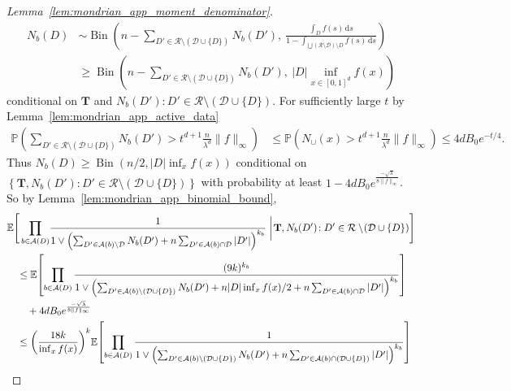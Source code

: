 \documentclass[11pt,lof]{puthesis}
\renewcommand{\P}{\ensuremath{\mathbb{P}}}
\newcommand{\E}{\ensuremath{\mathbb{E}}}
\newcommand{\bT}{\ensuremath{\mathbf{T}}}
\newcommand{\cR}{\ensuremath{\mathcal{R}}}
\newcommand{\cA}{\ensuremath{\mathcal{A}}}
\newcommand{\cD}{\ensuremath{\mathcal{D}}}
\DeclareMathOperator{\Bin}{Bin}
\newcommand{\diff}[1]{\,\mathrm{d}#1}
\theoremstyle{break}
\theoremstyle{proof}
\newtheorem{proof}{Proof}
\begin{document}
\begin{proof}[Lemma~\ref{lem:mondrian_app_moment_denominator}]
  \begin{align*}
    N_b(D)
    &\sim \Bin\left(
      n - \sum_{D' \in \cR \setminus (\cD \cup \{D\})} N_b(D'), \
      \frac{\int_{D} f(s) \diff s}
      {1 - \int_{\bigcup \left( \cR \setminus \cD \right) \setminus D}
      f(s) \diff s}
    \right) \\
    &\geq \Bin\left(
      n - \sum_{D' \in \cR \setminus (\cD \cup \{D\})} N_b(D'), \
      |D| \inf_{x \in [0,1]^d} f(x)
    \right)
  \end{align*}
  conditional on $\bT$ and
  $N_b(D') : D' \in \cR \setminus (\cD \cup \{D\})$.
  For sufficiently large $t$ by Lemma~\ref{lem:mondrian_app_active_data}
  \begin{align*}
    \P \left(
      \sum_{D' \in \cR \setminus (\cD \cup \{D\})} N_b(D')
    > t^{d+1} \frac{n}{\lambda^d} \|f\|_\infty \right)
    &\leq
    \P \left( N_{\cup}(x) > t^{d+1}
      \frac{n}{\lambda^d}
      \|f\|_\infty
    \right)
    \leq
    4 d B_0 e^{-t/4}.
  \end{align*}
  Thus
  $N_b(D) \geq \Bin(n/2, |D| \inf_x f(x))$
  conditional on
  $\left\{ \bT, N_b(D') : D' \in \cR \setminus (\cD \cup \{D\}) \right\}$
  with probability at least
  $1 - 4 d B_0 e^{\frac{-\sqrt \lambda}{8 \|f\|_\infty}}$.
  So by Lemma~\ref{lem:mondrian_app_binomial_bound},
  \begin{align*}
    &\E \Bigg[
      \prod_{b \in \cA(D)} \!
      \frac{1}{
        1 \vee \left(
          \sum_{D' \in \cA(b) \setminus \cD}
          N_b(D')
          + n \sum_{D' \in \cA(b) \cap \cD}
          |D'|
        \right)^{k_b}
      }
      \biggm|
      \!
      \bT,
      N_b(D')\! : D' \in \cR \setminus \! (\cD \cup \{D\})
    \Bigg] \\
    &\quad\leq
    \E \! \left[
      \prod_{b \in \cA(D)}
      \frac{(9k)^{k_b}}{
        1 \vee \left(
          \sum_{D' \in \cA(b) \setminus (\cD \cup \{D\})}
          N_b(D')
          + n |D| \inf_x f(x) / 2
          + n \sum_{D' \in \cA(b) \cap \cD}
          |D'|
      \right)^{k_b}}
    \right] \\
    &\qquad+
    4 d B_0 e^{\frac{-\sqrt \lambda}{8 \|f\|_\infty}} \\
    &\quad\leq
    \left( \frac{18k}{\inf_x f(x)} \right)^k
    \! \E \! \left[
      \prod_{b \in \cA(D)}
      \frac{1}{
        1 \vee \left(
          \sum_{D' \in \cA(b) \setminus (\cD \cup \{D\})}
          N_b(D')
          + n \sum_{D' \in \cA(b) \cap (\cD \cup \{D\})}
          |D'|
      \right)^{k_b}}
    \right] \\

\end{align*}
\end{proof}
\end{document}
